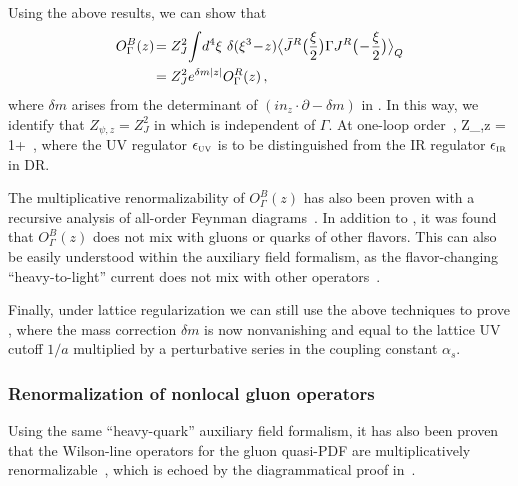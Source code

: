 Using the above results, we can show that
\begin{align} \label{eq:renproof}
	O^B_\Gamma(z)\!&= Z_J^2\!\int\! d^4\xi\ \delta(\xi^3\!-\!z)\big\langle \bar{J}^R\big({\xi\over2}\big) \Gamma  J^R\big(\!-\!{\xi\over2}\big)\big\rangle_Q\nn\\
	&= Z_J^2 e^{\delta m|z|} O^R_\Gamma(z)\,,
\end{align}
where $\delta m$ arises from the determinant of $(in_z\cdot \partial - \delta m)$ in . In this way, we identify that $Z_{\psi,z} =  Z_J^2 $ in  which is independent of $\Gamma$. At one-loop order~\cite{Stefanis:1983ke},
\beq \label{eq:zpsiz}
Z_{\psi,z} = 1+ \,,
\eeq
where the UV regulator $\epsilon_{\mbox{\tiny UV}}$ is to be distinguished from the IR regulator $\epsilon_{\mbox{\tiny IR}}$ in DR.

The multiplicative renormalizability of $ O^B_\Gamma(z)$ has also been proven with a recursive analysis of all-order Feynman diagrams~\cite{Ishikawa:2017faj}. In addition to , it was found that $O^B_\Gamma(z)$ does not mix with gluons or quarks of other flavors. This can also be easily understood within the auxiliary field formalism, as the flavor-changing ``heavy-to-light'' current does not mix with other operators~\cite{Green:2020xco}.

Finally, under lattice regularization we can still use the above techniques to prove , where the mass correction $\delta m$ is now nonvanishing and equal to the lattice UV cutoff $1/a$ multiplied by a perturbative series in the coupling constant $\alpha_s$.

\subsubsection{Renormalization of nonlocal gluon operators}

Using the same ``heavy-quark'' auxiliary field formalism, it has also been proven that the Wilson-line operators for the gluon quasi-PDF are multiplicatively renormalizable~\cite{Zhang:2018diq}, which is echoed by the diagrammatical proof in~\cite{Li:2018tpe}.

